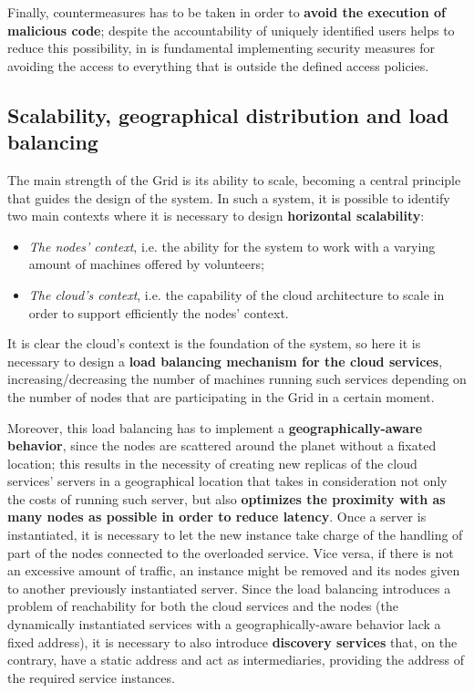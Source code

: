 Finally, countermeasures has to be taken in order to \textbf{avoid the execution of malicious code}; despite the accountability of uniquely identified users helps to reduce this possibility, in is fundamental implementing security measures for avoiding the access to everything that is outside the defined access policies.

\subsection{Scalability, geographical distribution and load balancing}\label{scalabilitu_geographical_distribution_and_load_balancing}
The main strength of the Grid is its ability to scale, becoming a central principle that guides the design of the system. In such a system, it is possible to identify two main contexts where it is necessary to design \textbf{horizontal scalability}:
\vspace{5mm}
\begin{itemize}
    \item \textit{The nodes' context}, i.e. the ability for the system to work with a varying amount of machines offered by volunteers;
    \item \textit{The cloud's context}, i.e. the capability of the cloud architecture to scale in order to support efficiently the nodes' context.
\end{itemize}

It is clear the cloud's context is the foundation of the system, so here it is necessary to design a \textbf{load balancing mechanism for the cloud services}, increasing/decreasing the number of machines running such services depending on the number of nodes that are participating in the Grid in a certain moment.

Moreover, this load balancing has to implement a \textbf{geographically-aware behavior}, since the nodes are scattered around the planet without a fixated location; this results in the necessity of creating new replicas of the cloud services' servers in a geographical location that takes in consideration not only the costs of running such server, but also \textbf{optimizes the proximity with as many nodes as possible in order to reduce latency}. Once a server is instantiated, it is necessary to let the new instance take charge of the handling of part of the nodes connected to the overloaded service. Vice versa, if there is not an excessive amount of traffic, an instance might be removed and its nodes given to another previously instantiated server.
Since the load balancing introduces a problem of reachability for both the cloud services and the nodes (the dynamically instantiated services with a geographically-aware behavior lack a fixed address), it is necessary to also introduce \textbf{discovery services} that, on the contrary, have a static address and act as intermediaries, providing the address of the required service instances.

